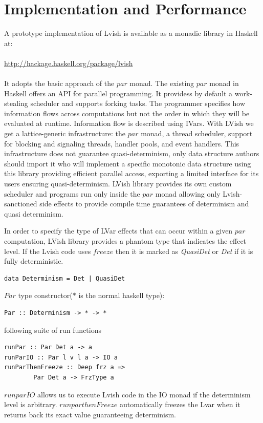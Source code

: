 \documentclass[twocolumn]{article}
\begin{document}
\section{Implementation and Performance}
A prototype implementation of Lvish is available as a monadic library in Haskell at:\\ \\
\url{http://hackage.haskell.org/package/lvish}\\ \\
It adopts the basic approach of the $par$ monad. The existing $par$ monad\cite{simon} in Haskell offers an API for parallel programming. It providess by default a work-stealing scheduler and supports forking tasks. The programmer specifies how information flows across computations but not the order in which they will be evaluated at runtime. Information flow is described using IVars. With LVish we get a lattice-generic infrastructure: the $par$ monad, a thread scheduler, support for blocking and signaling threads, handler pools, and event handlers. This infrastructure does not guarantee quasi-determinism, only data structure authors should import it who will implement a specific monotonic data structure using this library providing efficient parallel access, exporting a limited interface for its users ensuring quasi-determinism. LVish library provides its own custom scheduler and programs run only inside the $par$ monad allowing only Lvish-sanctioned side effects to provide compile time guarantees of determinism and quasi determinism.\par
In order to specify the type of LVar effects that can occur within a given $par$ computation, LVish library provides a phantom type that indicates the effect level. If the Lvish code uses $freeze$ then it is marked as \emph{QuasiDet} or \emph{Det} if it is fully deterministic. 
\begin{verbatim}
data Determinism = Det | QuasiDet
\end{verbatim}
$Par$ type constructor($\ast$ is the normal haskell type):
\begin{verbatim}
Par :: Determinism -> * -> *
\end{verbatim}
following suite of run functions
\begin{verbatim}
runPar :: Par Det a -> a
runParIO :: Par l v l a -> IO a
runParThenFreeze :: Deep frz a =>
	    Par Det a -> FrzType a
\end{verbatim}
$runparIO$ allows us to execute Lvish code in the IO monad if the determinism level is arbitrary. $runparthenFreeze$ automatically freezes the Lvar when it returns back its exact value guaranteeing determinism.\\ \\
\end{document}
